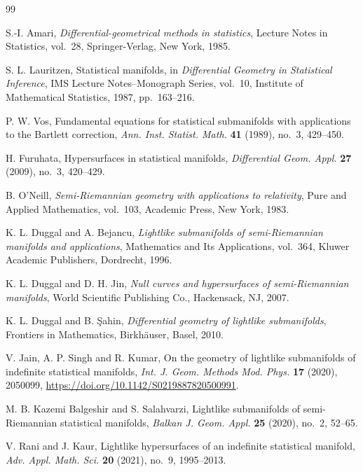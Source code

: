\documentclass[11pt,a4paper]{article}
\theoremstyle{remark}
\theoremstyle{definition}
\begin{document}
\begin{thebibliography}{99}

S.-I. Amari,
\textit{Differential-geometrical methods in statistics},
Lecture Notes in Statistics, vol.~28, Springer-Verlag, New York, 1985.

S. L. Lauritzen,
Statistical manifolds,
in \textit{Differential Geometry in Statistical Inference},
IMS Lecture Notes--Monograph Series, vol.~10,
Institute of Mathematical Statistics, 1987, pp.~163--216.

P. W. Vos,
Fundamental equations for statistical submanifolds with applications
to the Bartlett correction,
\textit{Ann. Inst. Statist. Math.} \textbf{41} (1989), no.~3, 429--450.

H. Furuhata,
Hypersurfaces in statistical manifolds,
\textit{Differential Geom. Appl.} \textbf{27} (2009), no.~3, 420--429.

B. O'Neill,
\textit{Semi-Riemannian geometry with applications to relativity},
Pure and Applied Mathematics, vol.~103,
Academic Press, New York, 1983.

K. L. Duggal and A. Bejancu,
\textit{Lightlike submanifolds of semi-Riemannian manifolds and applications},
Mathematics and Its Applications, vol.~364,
Kluwer Academic Publishers, Dordrecht, 1996.

K. L. Duggal and D. H. Jin,
\textit{Null curves and hypersurfaces of semi-Riemannian manifolds},
World Scientific Publishing Co., Hackensack, NJ, 2007.

K. L. Duggal and B. \c{S}ahin,
\textit{Differential geometry of lightlike submanifolds},
Frontiers in Mathematics, Birkh\"auser, Basel, 2010.

V. Jain, A. P. Singh and R. Kumar,
On the geometry of lightlike submanifolds of indefinite statistical
manifolds,
\textit{Int. J. Geom. Methods Mod. Phys.} \textbf{17} (2020), 2050099,
\url{https://doi.org/10.1142/S0219887820500991}.

M. B. Kazemi Balgeshir and S. Salahvarzi,
Lightlike submanifolds of semi-Riemannian statistical manifolds,
\textit{Balkan J. Geom. Appl.} \textbf{25} (2020), no.~2, 52--65.

V. Rani and J. Kaur,
Lightlike hypersurfaces of an indefinite statistical manifold,
\textit{Adv. Appl. Math. Sci.} \textbf{20} (2021), no.~9, 1995--2013.


\end{thebibliography}
\end{document}
